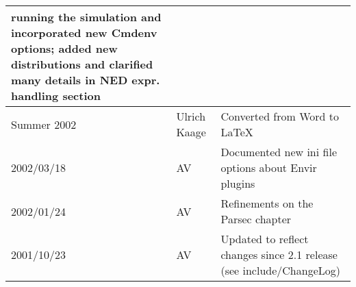 \begin{longtable}{|l|p{1cm}|p{10cm}|}
               running the simulation and incorporated new Cmdenv options; added new
               distributions and clarified many details in NED expr. handling section\\\hline
Summer 2002 & Ulrich Kaage & Converted from Word to LaTeX\\\hline
2002/03/18 & AV & Documented new ini file options about Envir plugins\\\hline
2002/01/24 & AV & Refinements on the Parsec chapter\\\hline
2001/10/23 & AV & Updated to reflect changes since 2.1 release (see include/ChangeLog)\\\hline
\end{longtable}




